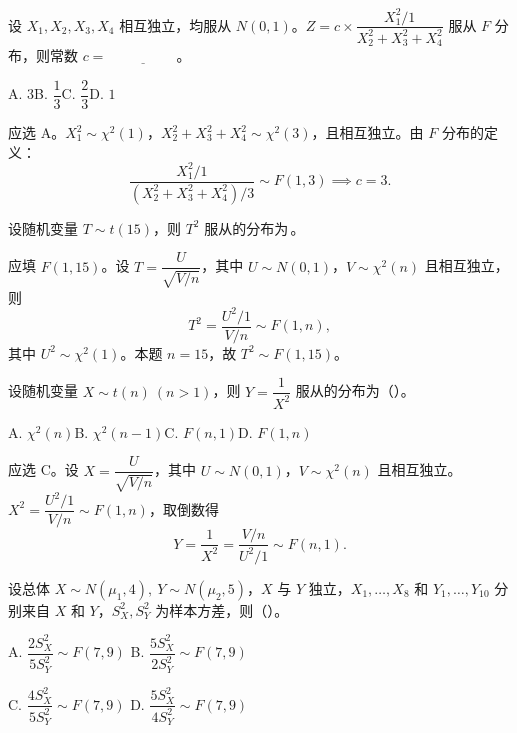 \documentclass[lang=cn,11pt]{elegantbook}
\begin{document}
\begin{exercise}\label{exer:6-f-const}
设 \(X_1, X_2, X_3, X_4\) 相互独立，均服从 \(N(0,1)\)。\(Z = c \times \dfrac{X_1^2/1}{X_2^2+X_3^2+X_4^2}\) 服从 \(F\) 分布，则常数 \(c =\,\underline{\hspace{2cm}}\)。\par
A. \(3\)\quad B. \(\dfrac{1}{3}\)\quad C. \(\dfrac{2}{3}\)\quad D. \(1\)
\end{exercise}
\begin{solution}
应选 A。\(X_1^2 \sim \chi^2(1)\)，\(X_2^2+X_3^2+X_4^2 \sim \chi^2(3)\)，且相互独立。由 \(F\) 分布的定义：
\[
\frac{X_1^2/1}{(X_2^2+X_3^2+X_4^2)/3} \sim F(1,3) \implies c = 3.
\]
\end{solution}

\begin{exercise}\label{exer:6-t2-f}
设随机变量 \(T \sim t(15)\)，则 \(T^2\) 服从的分布为\,\underline{\hspace{2cm}}。
\end{exercise}
\begin{solution}
应填 \(F(1,15)\)。设 \(T = \dfrac{U}{\sqrt{V/n}}\)，其中 \(U \sim N(0,1)\)，\(V \sim \chi^2(n)\) 且相互独立，则
\[
T^2 = \frac{U^2/1}{V/n} \sim F(1,n),
\]
其中 \(U^2 \sim \chi^2(1)\)。本题 \(n=15\)，故 \(T^2 \sim F(1,15)\)。
\end{solution}

\begin{exercise}\label{exer:6-inv-t2}
设随机变量 \(X \sim t(n)\ (n > 1)\)，则 \(Y = \dfrac{1}{X^2}\) 服从的分布为（\quad）。\par
A. \(\chi^2(n)\)\quad B. \(\chi^2(n-1)\)\quad C. \(F(n,1)\)\quad D. \(F(1,n)\)
\end{exercise}
\begin{solution}
应选 C。设 \(X = \dfrac{U}{\sqrt{V/n}}\)，其中 \(U \sim N(0,1)\)，\(V \sim \chi^2(n)\) 且相互独立。
\(X^2 = \dfrac{U^2/1}{V/n} \sim F(1,n)\)，取倒数得
\[
Y = \frac{1}{X^2} = \frac{V/n}{U^2/1} \sim F(n, 1).
\]
\end{solution}

\begin{exercise} \label{ex:sampling_03}
设总体 \(X\sim N(\mu_1,4),\ Y\sim N(\mu_2,5)\)，\(X\) 与 \(Y\) 独立，\(X_1,\dots,X_8\) 和 \(Y_1,\dots,Y_{10}\) 分别来自 \(X\) 和 \(Y\)，\(S_X^2,S_Y^2\) 为样本方差，则（\quad）。\par
A. \(\dfrac{2S_X^2}{5S_Y^2}\sim F(7,9)\)\qquad
B. \(\dfrac{5S_X^2}{2S_Y^2}\sim F(7,9)\)\par
C. \(\dfrac{4S_X^2}{5S_Y^2}\sim F(7,9)\)\qquad
D. \(\dfrac{5S_X^2}{4S_Y^2}\sim F(7,9)\)
\end{exercise}
\end{document}
